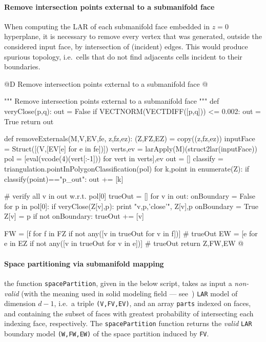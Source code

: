 \documentclass[11pt,oneside]{article}    %
\begin{document}
\paragraph{Remove intersection points external to a submanifold face}
When computing the LAR of each submanifold face embedded in $z=0$ hyperplane, it is necessary
to remove every vertex that was generated, outside the considered input face, by intersection of (incident) edges. This would produce spurious topology, i.e.~cells that do not find adjacents cells incident to their boundaries.

@D Remove intersection points external to a submanifold face
@{""" Remove intersection points external to a submanifold face """
def veryClose(p,q):
    out = False
    if VECTNORM(VECTDIFF([p,q])) <= 0.002:
        out = True
    return out

def removeExternals(M,V,EV,fe, z,fz,ez):
    (Z,FZ,EZ) = copy((z,fz,ez))
    inputFace = Struct([(V,[EV[e] for e in fe])])
    verts,ev = larApply(M)(struct2lar(inputFace))
    pol = [eval(vcode(4)(vert[:-1])) for vert in verts],ev
    out = []
    classify = triangulation.pointInPolygonClassification(pol)
    for k,point in enumerate(Z):
        if classify(point)=="p_out":  out += [k]

    # verify all v in out w.r.t. pol[0]
    trueOut = []
    for v in out: 
        onBoundary = False
        for p in pol[0]:
            if veryClose(Z[v],p):
                print "v,p,'close'", Z[v],p
                onBoundary = True
                Z[v] = p
        if not onBoundary: trueOut += [v]
    
    FW = [f for f in FZ if not any([v in trueOut for v in f])]  # trueOut
    EW = [e for e in EZ if not any([v in trueOut for v in e])]  # trueOut
    return Z,FW,EW
@}

\paragraph{Space partitioning via submanifold mapping}

the function \texttt{spacePartition}, given in the below script, takes as input a \emph{non-valid} (with the meaning used in solid modeling field --- see~\cite{Requicha:1980:RRS:356827.356833}) \texttt{LAR} model of dimension $d-1$, i.e.~a triple \texttt{(V,FV,EV)}, and an array \texttt{parts} indexed on faces, and containing the subset of faces with greatest probability of intersecting each indexing face, respectively. The \texttt{spacePartition} function returns the \emph{valid} \texttt{LAR} boundary model \texttt{(W,FW,EW)} of the space partition induced by \texttt{FV}.
 
\end{document}
